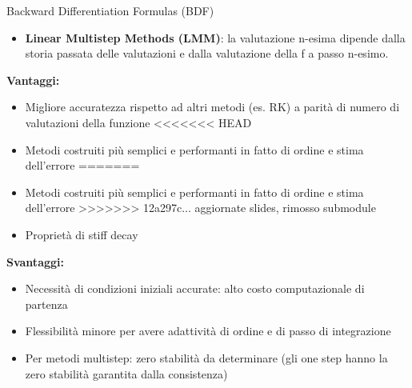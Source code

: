 \documentclass[aspectratio=169, 10pt, handout,usenames,dvipsnames]{beamer}
\begin{document}
    \begin{frame}{Backward Differentiation Formulas (BDF)}
        \begin{itemize}
            \item \textbf{Linear Multistep Methods (LMM)}: la valutazione n-esima dipende dalla storia passata delle valutazioni e dalla valutazione della f a passo n-esimo.
            \end{itemize}
            \textbf{Vantaggi:}
        \begin{itemize}
            \item Migliore accuratezza rispetto ad altri metodi (es. RK) a parità di numero di valutazioni della funzione
<<<<<<< HEAD
            \item Metodi costruiti più semplici e performanti in fatto di ordine e stima dell’errore
=======
            \item Metodi costruiti più semplici e performanti in fatto di ordine e stima dell’errore
>>>>>>> 12a297c... aggiornate slides, rimosso submodule
            \item Proprietà di stiff decay
        \end{itemize}
        \textbf{Svantaggi:}
        \begin{itemize}
            \item Necessità di condizioni iniziali accurate: alto costo computazionale di partenza
            \item Flessibilità minore per avere adattività di ordine e di passo di integrazione
            \item Per metodi multistep: zero stabilità da determinare (gli one step hanno la zero stabilità garantita dalla consistenza)
        \end{itemize}




    \end{frame}
\end{document}
